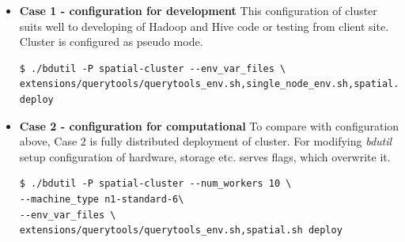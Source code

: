 \documentclass[a4paper,12pt,oneside]{report}
\begin{document}
	\begin{itemize}
		\item \textbf{Case 1 - configuration for development }  This configuration of cluster
		suits well to developing  of Hadoop and Hive code or testing from client site. 
		Cluster is configured as pseudo mode.
		\begin{footnotesize}
			\begin{lstlisting}[style=python]
$ ./bdutil -P spatial-cluster --env_var_files \
extensions/querytools/querytools_env.sh,single_node_env.sh,spatial.sh deploy
			\end{lstlisting}
		\end{footnotesize}
		
		
		\item \textbf{Case 2 - configuration for computational }  To compare with configuration
		above, Case 2 is fully 	distributed deployment of cluster. For modifying  \textit{bdutil} setup configuration
		of hardware, storage etc. serves flags, which overwrite it.
		\begin{footnotesize}
\begin{lstlisting}[style=python]
$ ./bdutil -P spatial-cluster --num_workers 10 \
--machine_type n1-standard-6\
--env_var_files \
extensions/querytools/querytools_env.sh,spatial.sh deploy
			\end{lstlisting}
		\end{footnotesize}
	\end{itemize}
	
	
	
	
\end{document}
